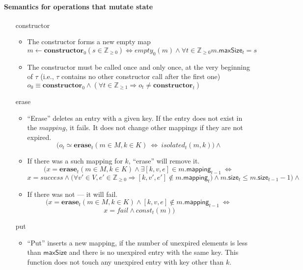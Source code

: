 \documentclass{article}
\renewcommand{\o}[1]{\ensuremath{\mathbf{#1}}}
\newcommand{\p}[1]{\ensuremath{\mathit{#1}}}
\newcommand{\s}[1]{\ensuremath{\mathsf{#1}}}
\newcommand{\nintset}{\ensuremath{\mathds{Z}_{\ge 0}}}
\newcommand{\moreset}[1]{\ensuremath{\mathds{Z}_{\ge #1}}}
\begin{document}
\paragraph{Semantics for operations that mutate state}
\begin{itemize}
  \item[constructor]
    \begin{itemize}
      \item The constructor forms a new empty map \\
        $m \gets \o{constructor}_0(s \in \nintset) \Leftrightarrow \p{empty}_0(m) \wedge \forall t \in \nintset m.\s{maxSize}_t=s$
      \item The constructor must be called once and only once, at the very beginning of $\tau$ (i.e., $\tau$ contains no other constructor call after the first one) \\
        $o_0 \equiv \o{constructor}_0 \wedge (\forall t\in \moreset{1} \Rightarrow o_t \neq \o{constructor}_t)$ 
    \end{itemize}
  \item[erase]
    \begin{itemize}
      \item ``Erase'' deletes an entry with a given key. If the entry does not exist in the \p{mapping}, it fails. It does not change other mappings if they are not expired.
        $$\Big(o_t \simeq \o{erase}_t(m\in M, k\in K) ~\Leftrightarrow~ \p{isolated}_t(m, k)\Big) \wedge$$
      \item If there was a such mapping for $k$, ``erase'' will remove it.
        $$\Big(x=\o{erase}_t(m\in M, k\in K) \wedge \exists [k, v, e] \in m.\s{mapping}_{t-1} ~\Leftrightarrow~$$
        $$x=success \wedge \big(\forall v'\in V, e'\in \nintset \Rightarrow [k, v', e'] \not\in m.\s{mapping}_t\big) \wedge m.\s{size}_t \le m.\s{size}_{t-1}-1 \Big) \wedge$$
      \item If there was not --- it will fail. 
        $$\Big(x=\o{erase}_t(m\in M, k\in K) \wedge [k,v,e]\not\in m.\s{mapping}_{t-1} ~\Leftrightarrow~$$
        $$x=fail \wedge \p{const}_t(m)\Big)$$
    \end{itemize}
    \item[put]
      \begin{itemize}
        \item ``Put'' inserts a new mapping, if the number of unexpired elements is less than \s{maxSize} and there is no unexpired entry with the same key.
          This function does not touch any unexpired entry with key other than $k$.

\end{itemize}
\end{itemize}
\end{document}
